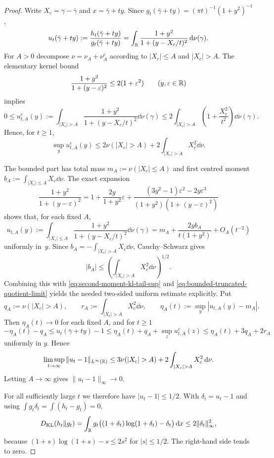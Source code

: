 \begin{proof}
Write $X_c=\gamma-\bar{\gamma}$ and $x=\bar{\gamma}+ty$.  Since
$g_t(\bar{\gamma}+ty)=(\pi t)^{-1}(1+y^2)^{-1}$,
\[
u_t(\bar{\gamma}+ty):=\frac{h_t(\bar{\gamma}+ty)}{g_t(\bar{\gamma}+ty)}
=\int_{\mathbb{R}}\frac{1+y^2}{1+(y-X_c/t)^2}\,\mathrm{d}\nu(\gamma).
\]
For $A>0$ decompose $\nu=\nu_A+\nu_A^c$ according to
$|X_c|\le A$ and $|X_c|>A$.  The elementary kernel bound
\begin{equation}\label{eq:second-moment-kl-kernel-bound}
\frac{1+y^2}{1+(y-\varepsilon)^2}
\le 2(1+\varepsilon^2)
\qquad(y,\varepsilon\in\mathbb{R})
\end{equation}
implies
\[
0\le u_{t,A}^c(y):=\int_{|X_c|>A}
\frac{1+y^2}{1+(y-X_c/t)^2}\dd\nu(\gamma)
\le 2\int_{|X_c|>A}\left(1+\frac{X_c^2}{t^2}\right)\dd\nu(\gamma).
\]
Hence, for $t\ge1$,
\begin{equation}\label{eq:second-moment-kl-tail-sup}
\sup_y u_{t,A}^c(y)
\le 2\nu(|X_c|>A)+2\int_{|X_c|>A}X_c^2\dd\nu .
\end{equation}

The bounded part has total mass $m_A:=\nu(|X_c|\le A)$ and first centred
moment $b_A:=\int_{|X_c|\le A}X_c\dd\nu$.  The exact expansion
\[
\frac{1+y^2}{1+(y-\varepsilon)^2}
=1+\frac{2y}{1+y^2}\varepsilon
+\frac{(3y^2-1)\varepsilon^2-2y\varepsilon^3}
{(1+y^2)(1+(y-\varepsilon)^2)}
\]
shows that, for each fixed $A$,
\begin{equation}\label{eq:bounded-truncated-quotient-limit}
u_{t,A}(y):=\int_{|X_c|\le A}
\frac{1+y^2}{1+(y-X_c/t)^2}\dd\nu(\gamma)
=m_A+\frac{2yb_A}{t(1+y^2)}+O_A(t^{-2})
\end{equation}
uniformly in~$y$.  Since
$b_A=-\int_{|X_c|>A}X_c\dd\nu$, Cauchy--Schwarz gives
\[
|b_A|\le \left(\int_{|X_c|>A}X_c^2\dd\nu\right)^{1/2}.
\]
Combining this with
\eqref{eq:second-moment-kl-tail-sup} and
\eqref{eq:bounded-truncated-quotient-limit} yields the needed two-sided
uniform estimate explicitly.  Put
\[
q_A:=\nu(|X_c|>A),\qquad
r_A:=\int_{|X_c|>A}X_c^2\dd\nu,\qquad
\eta_A(t):=\sup_y |u_{t,A}(y)-m_A|.
\]
Then \(\eta_A(t)\to0\) for each fixed \(A\), and for \(t\ge1\)
\[
-\eta_A(t)-q_A
\le u_t(\bar\gamma+ty)-1
\le \eta_A(t)+q_A+\sup_z u_{t,A}^c(z)
\le \eta_A(t)+3q_A+2r_A
\]
uniformly in \(y\).  Hence
\[
\limsup_{t\to\infty}\|u_t-1\|_{L^\infty(\RR)}
\le 3\nu(|X_c|>A)+2\int_{|X_c|>A}X_c^2\dd\nu .
\]
Letting $A\to\infty$ gives $\|u_t-1\|_\infty\to0$.

For all sufficiently large $t$ we therefore have
$|u_t-1|\le1/2$.  With $\delta_t=u_t-1$ and using
$\int g_t\delta_t=\int(h_t-g_t)=0$,
\[
D_{\mathrm{KL}}(h_t\|g_t)
=\int_{\mathbb{R}}g_t\bigl((1+\delta_t)\log(1+\delta_t)-\delta_t\bigr)\,\mathrm{d} x
\le 2\|\delta_t\|_\infty^2,
\]
because $(1+s)\log(1+s)-s\le2s^2$ for $|s|\le1/2$.  The right-hand side
tends to zero.
\end{proof}

